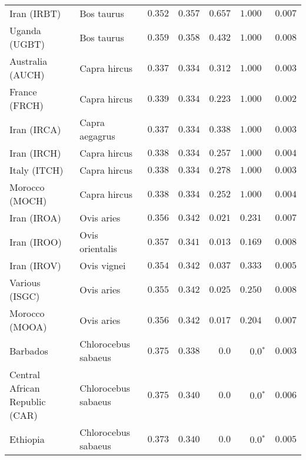 \begin{center}
\begin{adjustbox}{width = 1\textwidth}
\begin{tabular}{|l|l|r|r|r|r|r|}
            Iran (IRBT)               & Bos taurus        & $ 0.352$ & $ 0.357$ & $ 0.657$ & $ 1.000~~$        & $ 0.007$ \\
            Uganda (UGBT)                  & Bos taurus        & $ 0.359$ & $ 0.358$ & $ 0.432$ & $ 1.000~~$        & $ 0.008$ \\
            Australia (AUCH)                    & Capra hircus      & $ 0.337$ & $ 0.334$ & $ 0.312$ & $ 1.000~~$        & $ 0.003$ \\
            France (FRCH)                    & Capra hircus        & $ 0.339$ & $ 0.334$ & $ 0.223$ & $ 1.000~~$        & $ 0.002$ \\
            Iran (IRCA)                   & Capra aegagrus        & $ 0.337$ & $ 0.334$ & $ 0.338$ & $ 1.000~~$        & $ 0.003$ \\
            Iran (IRCH)                 & Capra hircus        & $ 0.338$ & $ 0.334$ & $ 0.257$ & $ 1.000~~$        & $ 0.004$ \\
            Italy (ITCH)                    & Capra hircus          & $ 0.338$ & $ 0.334$ & $ 0.278$ & $ 1.000~~$        & $ 0.003$ \\
            Morocco (MOCH)                    & Capra hircus     & $ 0.338$ & $ 0.334$ & $ 0.252$ & $ 1.000~~$        & $ 0.004$ \\
            Iran (IROA)                    & Ovis aries         & $ 0.356$ & $ 0.342$ & $ 0.021$ & $ 0.231~~$        & $ 0.007$ \\
            Iran (IROO)                 & Ovis orientalis          & $ 0.357$ & $ 0.341$ & $ 0.013$ & $ 0.169~~$        & $ 0.008$ \\
            Iran (IROV)                 & Ovis vignei          & $ 0.354$ & $ 0.342$ & $ 0.037$ & $ 0.333~~$        & $ 0.005$ \\
            Various (ISGC)                       & Ovis aries & $ 0.355$ & $ 0.342$ & $ 0.025$    & $ 0.250~~$    & $ 0.008$ \\
            Morocco (MOOA) & Ovis aries & $ 0.356$ & $ 0.342$ & $ 0.017$    & $ 0.204~~$ & $ 0.007$ \\
            Barbados                       & Chlorocebus sabaeus & $ 0.375$ & $ 0.338$ & $0.0$    & $\bm{0.0{^*}}$    & $ 0.003$ \\
            Central African Republic (CAR)                         & Chlorocebus sabaeus & $ 0.375$ & $ 0.340$ & $0.0$    & $\bm{0.0{^*}}$    & $ 0.006$ \\
            Ethiopia                          & Chlorocebus sabaeus & $ 0.373$ & $ 0.340$ & $0.0$    & $\bm{0.0{^*}}$    & $ 0.005$ \\

\end{tabular}
\end{adjustbox}
\end{center}
